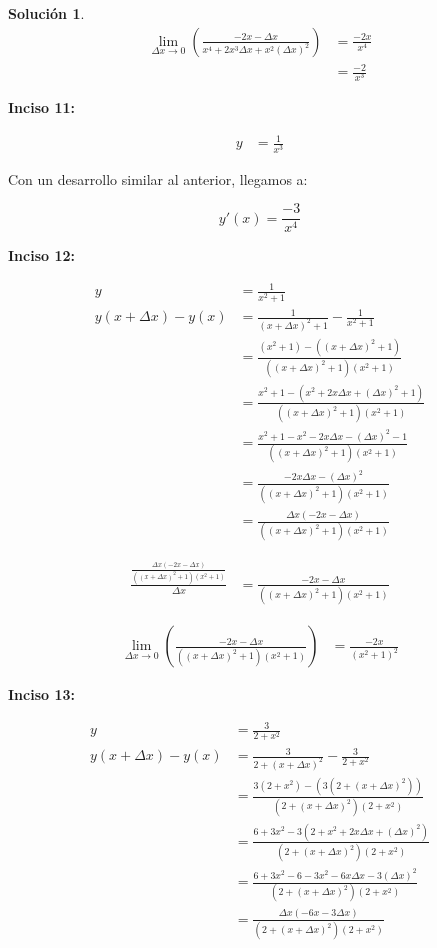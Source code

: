 \documentclass{article}
\theoremstyle{definition}
\newtheorem*{solution}{Solución}
\begin{document}
\begin{solution}
    \begin{align*}
        \lim_{\Delta x \to 0} (\frac{-2x-\Delta x}{x^4+2x^3\Delta x+x^2(\Delta x)^2}) &= \frac{-2x}{x^4} \\
        &= \frac{-2}{x^3}
    \end{align*} 

\textbf{Inciso 11:}

    \begin{align*}
        y &= \frac{1}{x^3} 
    \end{align*}

Con un desarrollo similar al anterior, llegamos a:

    \[
        y'(x) = \frac{-3}{x^4}
    \]

\textbf{Inciso 12:}

    \begin{align*}
        y &= \frac{1}{x^2+1} \\
        y(x+\Delta x) - y(x) &= \frac{1}{(x+\Delta x)^2+1}-\frac{1}{x^2+1} \\
        &= \frac{(x^2+1)-((x+\Delta x)^2+1)}{((x+\Delta x)^2+1)(x^2+1)} \\
        &= \frac{x^2+1-(x^2+2x\Delta x+(\Delta x)^2+1)}{((x+\Delta x)^2+1)(x^2+1)} \\
        &= \frac{x^2+1-x^2-2x\Delta x-(\Delta x)^2-1}{((x+\Delta x)^2+1)(x^2+1)} \\
        &= \frac{-2x\Delta x-(\Delta x)^2}{((x+\Delta x)^2+1)(x^2+1)} \\
        &= \frac{\Delta x(-2x-\Delta x)}{((x+\Delta x)^2+1)(x^2+1)}
    \end{align*}

    \begin{align*}
        \frac{\frac{\Delta x(-2x-\Delta x)}{((x+\Delta x)^2+1)(x^2+1)}}{\Delta x} &= \frac{-2x-\Delta x}{((x+\Delta x)^2+1)(x^2+1)}    
    \end{align*}

    \begin{align*}
        \lim_{\Delta x \to 0} (\frac{-2x-\Delta x}{((x+\Delta x)^2+1)(x^2+1)}) &= \frac{-2x}{(x^2+1)^2} 
    \end{align*} 

\textbf{Inciso 13:}

    \begin{align*}
        y &= \frac{3}{2+x^2} \\
        y(x+\Delta x) - y(x) &= \frac{3}{2+(x+\Delta x)^2} - \frac{3}{2+x^2} \\
        &= \frac{3(2+x^2)-(3(2+(x+\Delta x)^2))}{(2+(x+\Delta x)^2)(2+x^2)} \\
        &= \frac{6+3x^2-3(2+x^2+2x\Delta x+(\Delta x)^2)}{(2+(x+\Delta x)^2)(2+x^2)} \\
        &= \frac{6+3x^2-6-3x^2-6x\Delta x-3(\Delta x)^2}{(2+(x+\Delta x)^2)(2+x^2)} \\
        &= \frac{\Delta x(-6x-3\Delta x)}{(2+(x+\Delta x)^2)(2+x^2)}
    \end{align*}


\end{solution}
\end{document}

